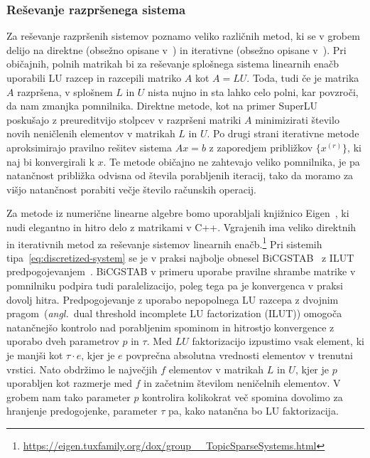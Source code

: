 \documentclass[12pt,a4paper]{article}
\theoremstyle{definition} %
\theoremstyle{plain} %
\numberwithin{equation}{section}
\newcommand{\ang}[1]{(\textit{angl.}\ #1)}
\begin{document}
\subsubsection{Reševanje razpršenega sistema}
Za reševanje razpršenih sistemov poznamo veliko različnih metod, ki se v grobem
delijo na direktne (obsežno opisane v~\cite{davis2006direct}) in iterativne
(obsežno opisane v~\cite{saad2003iterative}).
Pri običajnih, polnih matrikah bi za reševanje splošnega sistema linearnih enačb
uporabili LU razcep in razcepili matriko $A$ kot $A = LU$. Toda, tudi če je
matrika $A$ razpršena, v splošnem $L$ in $U$ nista nujno in sta lahko celo
polni, kar povzroči, da nam zmanjka pomnilnika. Direktne metode, kot na primer
SuperLU~\cite{li2005overview} poskušajo z
preureditvijo stolpcev v razpršeni matriki $A$ minimizirati število novih
neničlenih elementov v matrikah $L$ in $U$. Po drugi strani iterativne metode
aproksimirajo pravilno rešitev sistema $Ax=b$ z zaporedjem približkov $\{x^{(r)}\}$,
ki naj bi konvergirali k $x$. Te metode običajno ne zahtevajo veliko pomnilnika,
je pa natančnost približka odvisna od števila porabljenih iteracij, tako da
moramo za višjo natančnost porabiti večje število računskih operacij.

Za metode iz numerične linearne algebre bomo uporabljali knjižnico
Eigen~\cite{eigenweb}, ki nudi elegantno in hitro delo z matrikami v C++.
Vgrajenih ima veliko direktnih in iterativnih metod za reševanje sistemov
linearnih
enačb.\footnote{\url{https://eigen.tuxfamily.org/dox/group__TopicSparseSystems.html}
  \newline
[obiskano 17.\ 6.\ 2017]}
Pri sistemih tipa~\eqref{eq:discretized-system} se je
v praksi najbolje obnesel BiCGSTAB~\cite{van1992bi} z
ILUT predpogojevanjem~\cite{saad1994ilut}. BiCGSTAB v primeru uporabe pravilne
shrambe matrike v pomnilniku podpira tudi paralelizacijo, poleg tega pa je
konvergenca v praksi dovolj hitra. Predpogojevanje z uporabo nepopolnega LU
razcepa z dvojnim pragom~\ang{dual threshold incomplete LU factorization (ILUT)}
omogoča natančnejšo kontrolo nad porabljenim spominom in hitrostjo konvergence z
uporabo dveh parametrov $p$ in $\tau$. Med $LU$ faktorizacijo izpustimo vsak
element, ki je manjši kot $\tau\cdot e$, kjer je $e$ povprečna absolutna
vrednosti elementov v trenutni vrstici. Nato obdržimo le največjih $f$ elementov
v matrikah $L$ in $U$, kjer je $p$ uporabljen kot razmerje med $f$ in začetnim
številom neničelnih elementov. V grobem nam tako parameter $p$ kontrolira
kolikokrat več spomina dovolimo za hranjenje predogojenke,
parameter $\tau$ pa, kako natančna bo LU faktorizacija.
\end{document}
